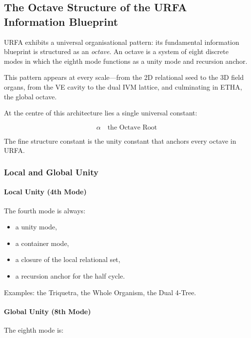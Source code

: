 \subsection{The Octave Structure of the URFA Information Blueprint}

URFA exhibits a universal organisational pattern: its fundamental information blueprint is structured as an \emph{octave}.  
An octave is a system of eight discrete modes in which the eighth mode functions as a unity mode and recursion anchor.

This pattern appears at every scale—from the 2D relational seed to the 3D field organs, from the VE cavity to the dual IVM lattice, and culminating in ETHA, the global octave.

At the centre of this architecture lies a single universal constant:

\[
\alpha \quad \text{the Octave Root}
\]

The fine structure constant is the unity constant that anchors every octave in URFA.

\subsubsection{Local and Global Unity}

\paragraph{Local Unity (4th Mode)}

The fourth mode is always:

\begin{itemize}
    \item a unity mode,
    \item a container mode,
    \item a closure of the local relational set,
    \item a recursion anchor for the half cycle.
\end{itemize}

Examples: the Triquetra, the Whole Organism, the Dual 4‑Tree.

\paragraph{Global Unity (8th Mode)}

The eighth mode is:

